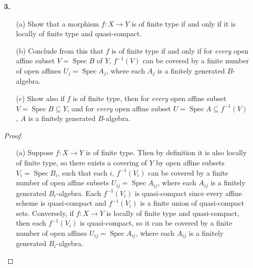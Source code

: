 \documentclass{article}
\DeclareMathOperator{\spec}{Spec}
\begin{document}
\begin{enumerate} [label=\textbf{\arabic*.}, leftmargin=0em]
\begin{proof}
    We reduce to proving the following statement: let $f : X \to Y$ be a morphism of schemes with $Y$ affine, which can be covered by open subsets $V_i$ such that $f^{-1}(V_i)$ is quasi-compact in $X$. Then $X$ is quasi-compact. Indeed, $Y$ is quasi-compact, so a finite number of $i$ will do, and a finite union of quasi-compact sets is quasi-compact, and $X = f^{-1}(Y) = f^{-1}(\bigcup_{i = 1}^n V_i) = \bigcup_{i = 1}^n f^{-1}(V_i)$, hence $X$ is quasi-compact.
\end{proof}

\item[\textbf{3.}]
\begin{itemize}
    \item[(a)] Show that a morphism $f : X \to Y$ is of finite type if and only if it is locally of finite type and quasi-compact.
    \item[(b)] Conclude from this that $f$ is of finite type if and only if for \textit{every} open affine subset $V = \spec{B}$ of $Y$, $f^{-1}(V)$ can be covered by a finite number of open affines $U_j = \spec{A_j}$, where each $A_j$ is a finitely generated $B$-algebra.
    \item[(c)] Show also if $f$ is of finite type, then for \textit{every} open affine subset $V = \spec{B} \subseteq Y$, and for \textit{every} open affine subset $U = \spec{A} \subseteq f^{-1}(V)$, $A$ is a finitely generated $B$-algebra.
\end{itemize}

\begin{proof} $ $ \vspace{0pt}
\begin{itemize} [leftmargin=0cm]
    \item[(a)] Suppose $f : X \to Y$ is of finite type. Then by definition it is also locally of finite type, so there exists a covering of $Y$ by open affine subsets $V_i = \spec{B_i}$, such that each $i$, $f^{-1}(V_i)$ can be covered by a finite number of open affine subsets $U_{ij} = \spec{A_{ij}}$, where each $A_{ij}$ is a finitely generated $B_i$-algebra. Each $f^{-1}(V_i)$ is quasi-compact since every affine scheme is quasi-compact and $f^{-1}(V_i)$ is a finite union of quasi-compact sets. Conversely, if $f : X \to Y$ is locally of finite type and quasi-compact, then each $f^{-1}(V_i)$ is quasi-compact, so it can be covered by a finite number of open affines $U_{ij} = \spec{A_{ij}}$, where each $A_{ij}$ is a finitely generated $B_i$-algebra.


\end{itemize}
\end{proof}
\end{enumerate}
\end{document}
